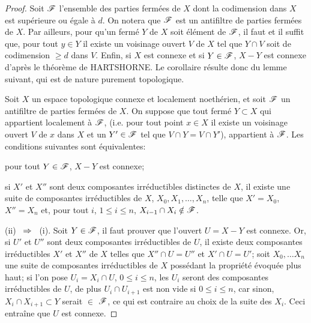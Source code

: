 \begin{proof}
Soit ${\mathscr F}$ l'ensemble des parties ferm\'ees de $X$ dont la codimension dans $X$ est sup\'erieure ou \'egale \`a $d$. On notera que ${\mathscr F}$ est un antifiltre de parties ferm\'ees de $X$. Par ailleurs, pour qu'un ferm\'e $Y$ de $X$ soit \'el\'ement de ${\mathscr F}$, il faut et il suffit que, pour tout $y\in Y$ il existe un voisinage ouvert $V$ de $X$ tel que $Y\cap V$ soit de codimension $\geq d$ dans $V$. Enfin, si $X$ est connexe et si $Y\in {\mathscr F}$, $X-Y$ est connexe d'apr\`es le th\'eor\`eme de HARTSHORNE. Le corollaire r\'esulte donc du lemme suivant, qui est de nature purement topologique.

\begin{lemme} \label{III.3.8}
Soit $X$ un espace topologique connexe et localement noeth\'erien, et soit ${\mathscr F}$ un antifiltre de parties ferm\'ees de $X$. On suppose que tout ferm\'e $Y\subset X$ qui appartient localement \`a ${\mathscr F}$, (i.e. pour tout point $x\in X$ il existe un voisinage ouvert $V$ de $x$ dans $X$ et un $Y'\in {\mathscr F}$ tel que $V\cap Y=V\cap Y'$), appartient \`a ${\mathscr F}$. Les conditions suivantes sont \'equivalentes:
\begin{enumeratei}

\item
pour tout $Y\in {\mathscr F}$, $X-Y$ est connexe;

\item
si $X'$ et $X''$ sont deux composantes irr\'eductibles distinctes de $X$, il existe une suite de composantes irr\'eductibles de $X$, $X_0, X_1, \ldots, X_n$, telle que $X'=X_0$, $X''=X_n$ et, pour tout $i$, $1\leq i\leq n$, $X_{i-1} \cap X_i \notin {\mathscr F}$.
\end{enumeratei}
\end{lemme}

(ii) ~$\To$~ (i). Soit $Y\in {\mathscr F}$, il faut prouver que l'ouvert $U=X-Y$ est connexe. Or, si $U'$ et $U''$ sont deux composantes irr\'eductibles de $U$, il existe deux composantes irr\'eductibles $X'$ et $X''$ de $X$ telles que $X''\cap U=U''$ et $X'\cap U=U'$; soit $X_0, \ldots X_n$ une suite de composantes irr\'eductibles de $X$ poss\'edant la propri\'et\'e \'evoqu\'ee plus haut; si l'on pose $U_i=X_i\cap U$, $0\leq i\leq n$, les $U_i$ seront des composantes irr\'eductibles de $U$, de plus $U_{i}\cap U_{i+1}$ est non vide si $0\leq i\leq n$, car sinon, {$X_{i}\cap X_{i+1} \subset Y$} serait $\in$ ${\mathscr F}$, ce qui est contraire au choix de la suite des $X_i$. Ceci entra\^ine que $U$ est connexe.


\end{proof}

